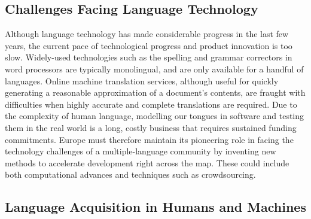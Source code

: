 \begin{multicols}{2}
\subsection{Challenges Facing Language Technology}

Although language technology has made considerable progress in the last few
years, the current pace of technological progress and product innovation is too
slow. Widely-used technologies such as the spelling and grammar correctors in
word processors are typically monolingual, and are only available for a handful
of languages. Online machine translation services, although useful for quickly
generating a reasonable approximation of a document’s contents, are fraught
with difficulties when highly accurate and complete translations are required.
Due to the complexity of human language, modelling our tongues in software and
testing them in the real world is a long, costly business that requires
sustained funding commitments. Europe must therefore maintain its pioneering
role in facing the technology challenges of a multiple-language community by
inventing new methods to accelerate development right across the map. These
could include both computational advances and techniques such as crowdsourcing.

\subsection{Language Acquisition in Humans and Machines}


\end{multicols}
